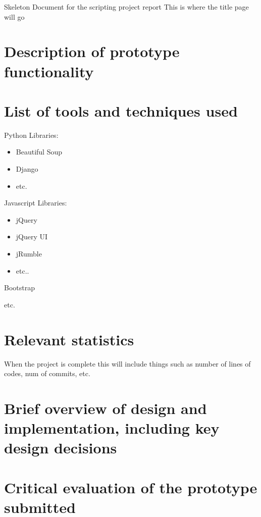 \documentclass[12pt, a4paper]{article}
\begin{document}
Skeleton Document for the scripting project report
This is where the title page will go

\newpage
\section{Description of prototype functionality}

\newpage
\section{List of tools and techniques used}
Python Libraries:
\begin{itemize}
\item Beautiful Soup
\item Django
\item etc.
\end{itemize}

Javascript Libraries:
\begin{itemize}
\item jQuery
\item jQuery UI
\item jRumble
\item etc..
\end{itemize}

Bootstrap

etc.

\newpage
\section{Relevant statistics}

When the project is complete this will include things such as number of lines of codes, num of commits, etc.


\newpage
\section{Brief overview of design and implementation, including key design decisions}

\newpage	
\section{Critical evaluation of the prototype submitted}
\end{document}

